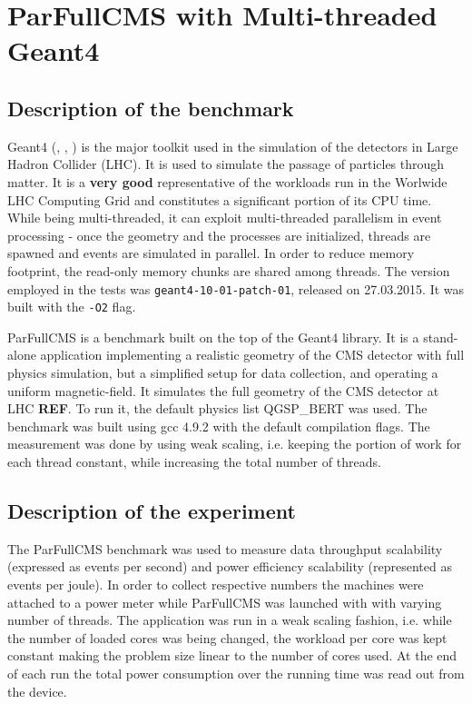 \documentclass[a4paper]{jpconf}
\begin{document}
\section{ParFullCMS with Multi-threaded Geant4}

\subsection{Description of the benchmark}
Geant4 (\cite{geant4-1}, \cite{geant4-2}, \cite{geant4-3}) is the major toolkit used in the simulation of the detectors in Large Hadron Collider (LHC). It is used to simulate the passage of particles through matter. It is a \textbf{very good} representative of the workloads run in the Worlwide LHC Computing Grid and constitutes a significant portion of its CPU time. While being multi-threaded, it can exploit multi-threaded parallelism in event processing - once the geometry and the processes are initialized, threads are spawned and events are simulated in parallel. In order to reduce memory footprint, the read-only memory chunks are shared among threads. The version employed in the tests was \verb!geant4-10-01-patch-01!, released on 27.03.2015. It was built with the \verb!-O2! flag.

ParFullCMS is a benchmark built on the top of the Geant4 library. It is a stand-alone application implementing a realistic geometry of the CMS detector with full physics simulation, but a simplified setup for data collection, and operating a uniform magnetic-field. It simulates the full geometry of the CMS detector at LHC \textbf{REF}. To run it, the default physics list QGSP\_BERT was used. The benchmark was built using gcc 4.9.2 with the default compilation flags. The measurement was done by using weak scaling, i.e. keeping the portion of work for each thread constant, while increasing the total number of threads.

\subsection{Description of the experiment}
The ParFullCMS benchmark was used to measure data throughput scalability (expressed as events per second) and power efficiency scalability (represented as events per joule). In order to collect respective numbers the machines were attached to a power meter while ParFullCMS was launched with with varying number of threads. The application was run in a weak scaling fashion, i.e. while the number of loaded cores was being changed, the workload per core was kept constant making the problem size linear to the number of cores used. At the end of each run the total power consumption over the running time was read out from the device.
\end{document}
